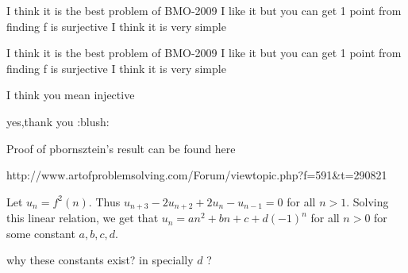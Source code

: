 \begin{solution}
	I think it is the best problem of BMO-2009  I like it but you can get 1 point from finding f is surjective I think it is very simple
\end{solution}



\begin{solution}
	\begin{tcolorbox}I think it is the best problem of BMO-2009  I like it but you can get 1 point from finding f is surjective I think it is very simple\end{tcolorbox}

I think you mean injective  
\end{solution}



\begin{solution}
	yes,thank you :blush:
\end{solution}



\begin{solution}
	Proof of pbornsztein's result can be found here

http://www.artofproblemsolving.com/Forum/viewtopic.php?f=591&t=290821
\end{solution}



\begin{solution}
	\begin{tcolorbox}
Let $ u_n = f^2(n)$. Thus $ u_{n+3} - 2u_{n+2} + 2u_n - u_{n-1} = 0$ for all $ n>1$.
Solving this linear relation, we get that $ u_n = an^2 + bn + c + d(-1)^n$ for all $ n > 0$ for some constant $ a,b,c,d$.
\end{tcolorbox} why these constants exist? in specially $ d $ ?
\end{solution}



